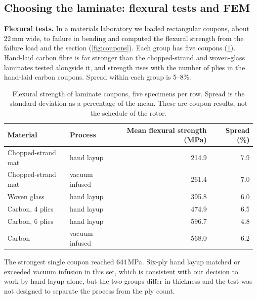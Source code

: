 \documentclass[11pt,letterpaper]{article}
\begin{document}
\subsection{Choosing the laminate: flexural tests and FEM}\label{sec:fem}
\textbf{Flexural tests.} In a materials laboratory we loaded rectangular coupons, about 22\,mm wide, to failure in bending and computed the flexural strength from the failure load and the section (\cref{fig:coupons}). Each group has five coupons (\cref{tab:flex}). Hand-laid carbon fibre is far stronger than the chopped-strand and woven-glass laminates tested alongside it, and strength rises with the number of plies in the hand-laid carbon coupons. Spread within each group is 5--8\%.
\begin{table}[t]\centering\small
\begin{tabular}{@{}llrr@{}}\toprule
Material & Process & Mean flexural strength (MPa) & Spread (\%)\\\midrule
Chopped-strand mat & hand layup & 214.9 & 7.9\\
Chopped-strand mat & vacuum infused & 261.4 & 7.0\\
Woven glass & hand layup & 395.8 & 6.0\\
Carbon, 4 plies & hand layup & 474.9 & 6.5\\
Carbon, 6 plies & hand layup & 596.7 & 4.8\\
Carbon & vacuum infused & 568.0 & 6.2\\\bottomrule
\end{tabular}
\caption{Flexural strength of laminate coupons, five specimens per row. Spread is the standard deviation as a percentage of the mean. These are coupon results, not the schedule of the rotor.}\label{tab:flex}
\end{table}
The strongest single coupon reached 644\,MPa. Six-ply hand layup matched or exceeded vacuum infusion in this set, which is consistent with our decision to work by hand layup alone, but the two groups differ in thickness and the test was not designed to separate the process from the ply count.
\end{document}
